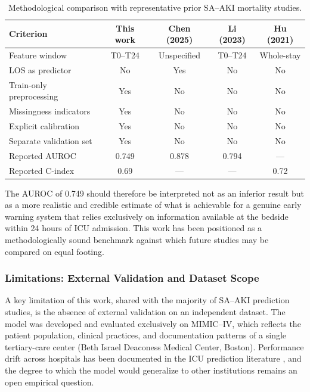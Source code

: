 \begin{table}[htb!]
    \centering
    \caption{Methodological comparison with representative prior SA--AKI mortality studies.}
    \label{tab:comparison_prior}
    \small
    \begin{tabular}{lcccc}
        \toprule
        \textbf{Criterion} & \textbf{This work} & \textbf{Chen (2025)} & \textbf{Li (2023)} & \textbf{Hu (2021)} \\
        \midrule
        Feature window & T0--T24 & Unspecified & T0--T24 & Whole-stay \\
        LOS as predictor & No & Yes & No & No \\
        Train-only preprocessing & Yes & No & No & No \\
        Missingness indicators & Yes & No & No & No \\
        Explicit calibration & Yes & No & No & No \\
        Separate validation set & Yes & No & No & No \\
        Reported AUROC & 0.749 & 0.878 & 0.794 & --- \\
        Reported C-index & 0.69 & --- & --- & 0.72 \\
        \bottomrule
    \end{tabular}
\end{table}

The AUROC of 0.749 should therefore be interpreted not as an inferior result but as a more realistic and credible estimate of what is achievable for a genuine early warning system that relies exclusively on information available at the bedside within 24 hours of ICU admission. This work has been positioned as a methodologically sound benchmark against which future studies may be compared on equal footing.

\subsubsection{Limitations: External Validation and Dataset Scope}\label{sec:external-validation}
A key limitation of this work, shared with the majority of SA--AKI prediction studies, is the absence of external validation on an independent dataset. The model was developed and evaluated exclusively on MIMIC--IV, which reflects the patient population, clinical practices, and documentation patterns of a single tertiary-care center (Beth Israel Deaconess Medical Center, Boston). Performance drift across hospitals has been documented in the ICU prediction literature \citep{Rockenschaub_2024}, and the degree to which the model would generalize to other institutions remains an open empirical question.

